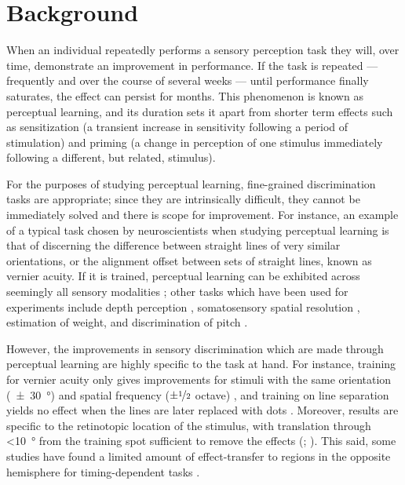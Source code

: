 \section{Background}
\label{sec:pl_bg}
\label{sec:bgpl}

When an individual repeatedly performs a sensory perception task they will, over time, demonstrate an improvement in performance.
If the task is repeated --- frequently and over the course of several weeks --- until performance finally saturates, the effect can persist for months.
This phenomenon is known as perceptual learning, and its duration sets it apart from shorter term effects such as sensitization (a transient increase in sensitivity following a period of stimulation) and priming (a change in perception of one stimulus immediately following a different, but related, stimulus).

For the purposes of studying perceptual learning, fine-grained discrimination tasks are appropriate; since they are intrinsically difficult, they cannot be immediately solved and there is scope for improvement.
For instance, an example of a typical task chosen by neuroscientists when studying perceptual learning is that of discerning the difference between straight lines of very similar orientations, or the alignment offset between sets of straight lines, known as vernier acuity.
If it is trained, perceptual learning can be exhibited across seemingly all sensory modalities \citep{Gibson1955,Gilbert1994,Gilbert2001,Dinse2003}; other tasks which have been used for experiments include depth perception \citep{Westheimer1988,Fendick1983145}, somatosensory spatial resolution \citep{Pleger09102001,Godde1597}, estimation of weight, and discrimination of pitch \citep{demany1985perceptual,Carcagno2011}.

However, the improvements in sensory discrimination which are made through perceptual learning are highly specific to the task at hand.
For instance, training for vernier acuity only gives improvements for stimuli with the same orientation (\SI{\pm30}{\degree}) and spatial frequency ($\pm\nicefrac{1}{2}$ octave) \citep{Fiorentini1980,Poggio1991}, and training on line separation yields no effect when the lines are later replaced with dots \citep{Poggio1992}.
Moreover, results are specific to the retinotopic location of the stimulus, with translation through \SI{<10}{\degree} from the training spot sufficient to remove the effects (\citealp{Fiorentini1980}; \citealp{Fiorentini1981,Poggio1991,Karni1991}).
This said, some studies have found a limited amount of effect-transfer to regions in the opposite hemisphere for timing-dependent tasks \citep{Ball1987,Berardi1987}.


